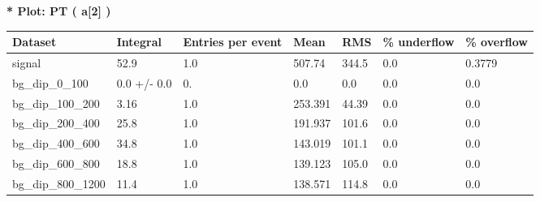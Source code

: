 \documentclass[a4paper, 10pt]{article}
\begin{document}
\textbf{* Plot: PT ( a[2] ) }\\
   \begin{table}[H]
  \begin{center}
    \begin{tabular}{|m{23.0mm}|m{23.0mm}|m{18.0mm}|m{19.0mm}|m{19.0mm}|m{19.0mm}|m{19.0mm}|}
      \hline
      {\cellcolor{yellow}         Dataset}& {\cellcolor{yellow}         Integral}& {\cellcolor{yellow}         Entries per event}& {\cellcolor{yellow}         Mean}& {\cellcolor{yellow}         RMS}& {\cellcolor{yellow}         \% underflow}& {\cellcolor{yellow}         \% overflow}\\
      \hline
      {\cellcolor{white}         signal}& {\cellcolor{white}         52.9}& {\cellcolor{white}         1.0}& {\cellcolor{white}         507.74}& {\cellcolor{white}         344.5}& {\cellcolor{green}         0.0}& {\cellcolor{green}         0.3779}\\
      \hline
      {\cellcolor{white}         bg\_dip\_0\_100}& {\cellcolor{white}         0.0 +/\-- 0.0}& {\cellcolor{white}         0.}& {\cellcolor{white}         0.0}& {\cellcolor{white}         0.0}& {\cellcolor{green}         0.0}& {\cellcolor{green}         0.0}\\
      \hline
      {\cellcolor{white}         bg\_dip\_100\_200}& {\cellcolor{white}         3.16}& {\cellcolor{white}         1.0}& {\cellcolor{white}         253.391}& {\cellcolor{white}         44.39}& {\cellcolor{green}         0.0}& {\cellcolor{green}         0.0}\\
      \hline
      {\cellcolor{white}         bg\_dip\_200\_400}& {\cellcolor{white}         25.8}& {\cellcolor{white}         1.0}& {\cellcolor{white}         191.937}& {\cellcolor{white}         101.6}& {\cellcolor{green}         0.0}& {\cellcolor{green}         0.0}\\
      \hline
      {\cellcolor{white}         bg\_dip\_400\_600}& {\cellcolor{white}         34.8}& {\cellcolor{white}         1.0}& {\cellcolor{white}         143.019}& {\cellcolor{white}         101.1}& {\cellcolor{green}         0.0}& {\cellcolor{green}         0.0}\\
      \hline
      {\cellcolor{white}         bg\_dip\_600\_800}& {\cellcolor{white}         18.8}& {\cellcolor{white}         1.0}& {\cellcolor{white}         139.123}& {\cellcolor{white}         105.0}& {\cellcolor{green}         0.0}& {\cellcolor{green}         0.0}\\
      \hline
      {\cellcolor{white}         bg\_dip\_800\_1200}& {\cellcolor{white}         11.4}& {\cellcolor{white}         1.0}& {\cellcolor{white}         138.571}& {\cellcolor{white}         114.8}& {\cellcolor{green}         0.0}& {\cellcolor{green}         0.0}\\

\end{tabular}
\end{center}
\end{table}
\end{document}
